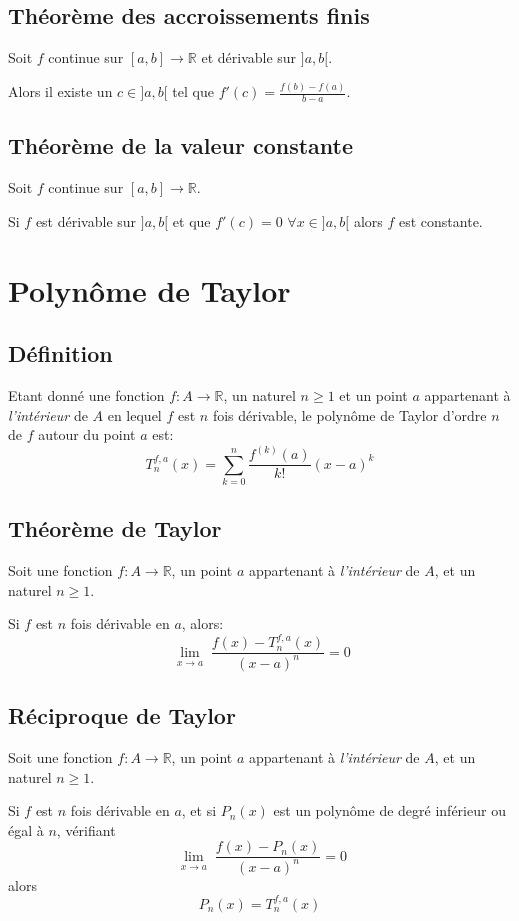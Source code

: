 \subsection{Théorème des accroissements finis}
Soit $f$ continue sur $ [a,b] \rightarrow \mathbb{R}$ et dérivable sur $]a,b[$.

Alors il existe un $c \in ]a,b[$ tel que $f'(c) = \frac{f(b) - f(a)}{b - a}$.

\subsection{Théorème de la valeur constante}
Soit $f$ continue sur $ [a,b] \rightarrow \mathbb{R}$.

Si $f$ est dérivable sur $]a,b[$ et que
$f'(c) = 0$ $\forall x \in ]a,b[$ alors $f$ est constante.

\section{Polynôme de Taylor}
\subsection{Définition}
Etant donné une fonction $f : A \rightarrow \mathbb{R}$,
un naturel $n \geq 1$ et un point $a$ appartenant à \emph{l'intérieur}
de $A$ en lequel $f$ est $n$ fois dérivable,
le polynôme de Taylor d'ordre $n$ de $f$ autour du point $a$ est:
\[ T_n^{f,a}(x) = \sum_{k = 0}^n \frac{f^{(k)}(a)}{k!}(x - a)^k \]

\subsection{Théorème de Taylor}
Soit une fonction $f : A \rightarrow \mathbb{R}$,
un point $a$ appartenant à \emph{l'intérieur} de $A$,
et un naturel $n \geq 1$.

Si $f$ est $n$ fois dérivable en $a$, alors:
\[ \lim_{\substack{x \rightarrow a}}
\frac{f(x) - T_n^{f,a}(x)}{(x - a)^n} = 0 \]

\subsection{Réciproque de Taylor}
Soit une fonction $f : A \rightarrow \mathbb{R}$, un point $a$ appartenant
à \emph{l'intérieur} de $A$, et un naturel $n \geq 1$.

Si $f$ est $n$ fois dérivable en $a$, et si
$P_n(x)$ est un polynôme de degré inférieur ou égal à $n$, vérifiant
\[ \lim_{\substack{x \rightarrow a}} \frac{f(x) - P_n(x)}{(x - a)^n} = 0 \]
alors
\[ P_n(x) = T_n^{f,a}(x) \]

